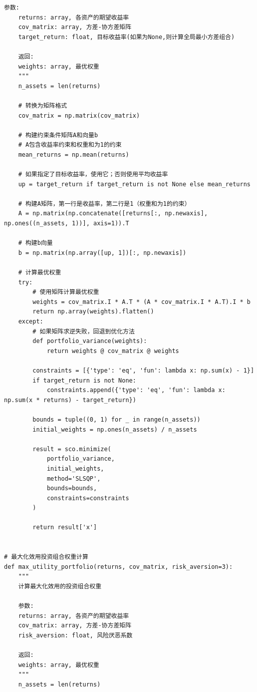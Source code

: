 \documentclass[12pt, a4paper]{article}
\begin{document}
\begin{lstlisting}[basicstyle=\small\ttfamily, breaklines=true, columns=fullflexible]
    参数:
    returns: array, 各资产的期望收益率
    cov_matrix: array, 方差-协方差矩阵
    target_return: float, 目标收益率(如果为None,则计算全局最小方差组合)
    
    返回:
    weights: array, 最优权重
    """
    n_assets = len(returns)
    
    # 转换为矩阵格式
    cov_matrix = np.matrix(cov_matrix)
    
    # 构建约束条件矩阵A和向量b
    # A包含收益率约束和权重和为1的约束
    mean_returns = np.mean(returns)
    
    # 如果指定了目标收益率，使用它；否则使用平均收益率
    up = target_return if target_return is not None else mean_returns
    
    # 构建A矩阵，第一行是收益率，第二行是1（权重和为1的约束）
    A = np.matrix(np.concatenate([returns[:, np.newaxis], np.ones((n_assets, 1))], axis=1)).T
    
    # 构建b向量
    b = np.matrix(np.array([up, 1])[:, np.newaxis])
    
    # 计算最优权重
    try:
        # 使用矩阵计算最优权重
        weights = cov_matrix.I * A.T * (A * cov_matrix.I * A.T).I * b
        return np.array(weights).flatten()
    except:
        # 如果矩阵求逆失败，回退到优化方法
        def portfolio_variance(weights):
            return weights @ cov_matrix @ weights
        
        constraints = [{'type': 'eq', 'fun': lambda x: np.sum(x) - 1}]
        if target_return is not None:
            constraints.append({'type': 'eq', 'fun': lambda x: np.sum(x * returns) - target_return})
        
        bounds = tuple((0, 1) for _ in range(n_assets))
        initial_weights = np.ones(n_assets) / n_assets
        
        result = sco.minimize(
            portfolio_variance,
            initial_weights,
            method='SLSQP',
            bounds=bounds,
            constraints=constraints
        )
        
        return result['x']


# 最大化效用投资组合权重计算
def max_utility_portfolio(returns, cov_matrix, risk_aversion=3):
    """
    计算最大化效用的投资组合权重
    
    参数:
    returns: array, 各资产的期望收益率
    cov_matrix: array, 方差-协方差矩阵
    risk_aversion: float, 风险厌恶系数
    
    返回:
    weights: array, 最优权重
    """
    n_assets = len(returns)
    

\end{lstlisting}
\end{document}
